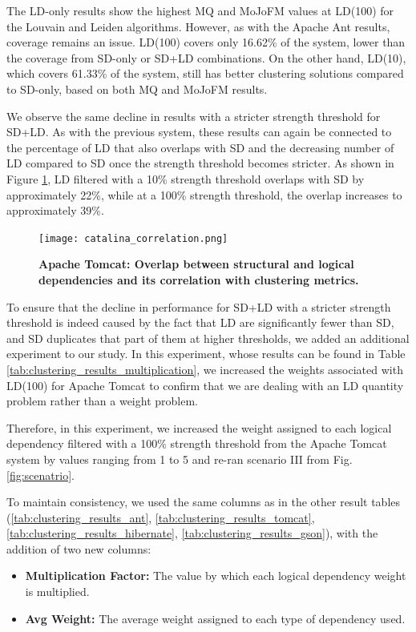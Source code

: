 \documentclass{ieeeaccess}
\begin{document}
The LD-only results show the highest MQ and MoJoFM values at LD(100) for the Louvain and Leiden algorithms. However, as with the Apache Ant results, coverage remains an issue. LD(100) covers only 16.62\% of the system, lower than the coverage from SD-only or SD+LD combinations. On the other hand, LD(10), which covers 61.33\% of the system, still has better clustering solutions compared to SD-only, based on both MQ and MoJoFM results.

We observe the same decline in results with a stricter strength threshold for SD+LD. As with the previous system, these results can again be connected to the percentage of LD that also overlaps with SD and the decreasing number of LD compared to SD once the strength threshold becomes stricter. As shown in Figure \ref{fig:catalina_correlation}, LD filtered with a 10\% strength threshold overlaps with SD by approximately 22\%, while at a 100\% strength threshold, the overlap increases to approximately 39\%.

\begin{figure}[t!]
\centering
\texttt{[image: catalina\_correlation.png]}
\caption{\textbf{Apache Tomcat: Overlap between structural and logical dependencies and its correlation with clustering metrics.}}
\label{fig:catalina_correlation}
\end{figure}

To ensure that the decline in performance for SD+LD with a stricter strength threshold is indeed caused by the fact that LD are significantly fewer than SD, and SD duplicates that part of them at higher thresholds, we added an additional experiment to our study. In this experiment, whose results can be found in Table \ref{tab:clustering_results_multiplication}, we increased the weights associated with LD(100) for Apache Tomcat to confirm that we are dealing with an LD quantity problem rather than a weight problem.

Therefore, in this experiment, we increased the weight assigned to each logical dependency filtered with a 100\% strength threshold from the Apache Tomcat system by values ranging from 1 to 5 and re-ran scenario III from Fig. \ref{fig:scenatrio}.


To maintain consistency, we used the same columns as in the other result tables (\ref{tab:clustering_results_ant}, \ref{tab:clustering_results_tomcat}, \ref{tab:clustering_results_hibernate}, \ref{tab:clustering_results_gson}), with the addition of two new columns:
\begin{itemize}
\item \textbf{Multiplication Factor:} The value by which each logical dependency weight is multiplied.
\item \textbf{Avg Weight:} The average weight assigned to each type of dependency used.
\end{itemize}
\end{document}
